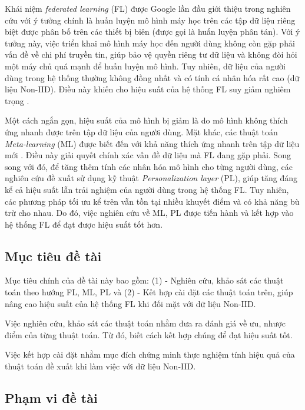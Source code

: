 Khái niệm \textit{federated learning} (FL) được Google lần đầu giới thiệu trong nghiên cứu \cite{mcmahan2017communication} với ý tưởng chính là huấn luyện mô hình máy học trên các tập dữ liệu riêng biệt được phân bố trên các thiết bị biên (được gọi là huấn luyện phân tán). Với ý tưởng này, việc triển khai mô hình máy học đến người dùng không còn gặp phải vấn đề về chi phí truyền tin, giúp bảo vệ quyền riêng tư dữ liệu và không đòi hỏi một máy chủ quá mạnh để huấn luyện mô hình. Tuy nhiên, dữ liệu của người dùng trong hệ thống thường không đồng nhất và có tính cá nhân hóa rất cao (dữ liệu Non-IID). Điều này khiến cho hiệu suất của hệ thống FL suy giảm nghiêm trọng \cite{zhao2018federated}.

Một cách ngắn gọn, hiệu suất của mô hình bị giảm là do mô hình không thích ứng nhanh được trên tập dữ liệu của người dùng. Mặt khác, các thuật toán \textit{Meta-learning} (ML) được biết đến với khả năng thích ứng nhanh trên tập dữ liệu mới \cite{hospedales2020meta}. Điều này giải quyết chính xác vấn đề dữ liệu mà FL đang gặp phải. Song song với đó, để tăng thêm tính các nhân hóa mô hình cho từng người dùng, các nghiên cứu \parencite{arivazhagan2019federated, liang2020think} đề xuất sử dụng kỹ thuật \textit{Personalization layer} (PL), giúp tăng đáng kể cả hiệu suất lẫn trải nghiệm của người dùng trong hệ thống FL. Tuy nhiên, các phương pháp tối ưu kể trên vẫn tồn tại nhiều khuyết điểm và có khả năng bù trừ cho nhau. Do đó, việc nghiên cứu về ML, PL được tiến hành và kết hợp vào hệ thống FL để đạt được hiệu suất tốt hơn.

\subsection*{Mục tiêu đề tài}

Mục tiêu chính của đề tài này bao gồm: (1) - Nghiên cứu, khảo sát các thuật toán theo hướng FL, ML, PL và (2) - Kết hợp cài đặt các thuật toán trên, giúp nâng cao hiệu suất của hệ thống FL khi đối mặt với dữ liệu Non-IID.

Việc nghiên cứu, khảo sát các thuật toán nhằm đưa ra đánh giá về ưu, nhược điểm của từng thuật toán. Từ đó, biết cách kết hợp chúng để đạt hiệu suất tốt.

Việc kết hợp cài đặt nhằm mục đích chứng minh thực nghiệm tính hiệu quả của thuật toán đề xuất khi làm việc với dữ liệu Non-IID.

\subsection*{Phạm vi đề tài}

